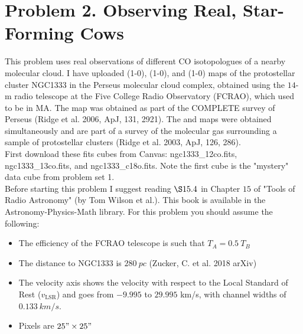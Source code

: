 \documentclass[11pt]{article}
\begin{document}
\section*{Problem 2. Observing Real, Star-Forming Cows}
This problem uses real observations of different CO isotopologues of a nearby molecular cloud. I have uploaded  (1-0),  (1-0), and  (1-0) maps of the protostellar cluster NGC1333 in the Perseus molecular cloud complex, obtained using the $14$-m radio telescope at the Five College Radio Observatory (FCRAO), which used to be in MA. The  map was obtained as part of the COMPLETE survey of Perseus (Ridge et al. 2006, ApJ, 131, 2921). The  and  maps were obtained simultaneously and are part of a survey of the molecular gas surrounding a sample of protostellar clusters (Ridge et al. 2003, ApJ, 126, 286).\\
\indent First download these fits cubes from Canvas: ngc1333\_12co.fits, ngc1333\_13co.fits, and ngc1333\_c18o.fits. Note the first cube is the "mystery" data cube from problem set 1.\\
\indent Before starting this problem I suggest reading $\S15.4$ in Chapter $15$ of "Tools of Radio Astronomy" (by Tom Wilson et al.). This book is available in the Astronomy-Physics-Math library. For this problem you should assume the following:
\begin{itemize}
\item The efficiency of the FCRAO telescope is such that $T_{A} = 0.5\ T_{B}$
\item The distance to NGC1333 is $280\ \si{pc}$ (Zucker, C. et al. 2018 arXiv)
\item The velocity axis shows the velocity with respect to the Local Standard of Rest ($v_{\text{LSR}}$) and goes from $-9.995$ to $29.995$ \si{km/s}, with channel widths of $0.133\ \si{km/s}$.
\item Pixels are $25" \times 25"$
\end{itemize}
\end{document}

